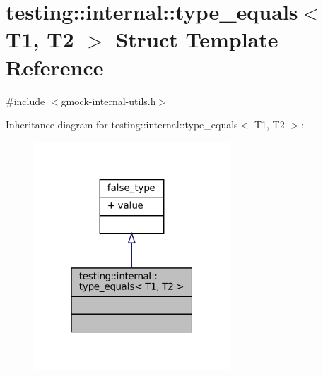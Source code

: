\hypertarget{structtesting_1_1internal_1_1type__equals}{}\section{testing\+:\+:internal\+:\+:type\+\_\+equals$<$ T1, T2 $>$ Struct Template Reference}
\label{structtesting_1_1internal_1_1type__equals}


{\ttfamily \#include $<$gmock-\/internal-\/utils.\+h$>$}



Inheritance diagram for testing\+:\+:internal\+:\+:type\+\_\+equals$<$ T1, T2 $>$\+:
\nopagebreak
\begin{figure}[H]
\begin{center}
\leavevmode
\includegraphics[width=208pt]{structtesting_1_1internal_1_1type__equals__inherit__graph}
\end{center}
\end{figure}



